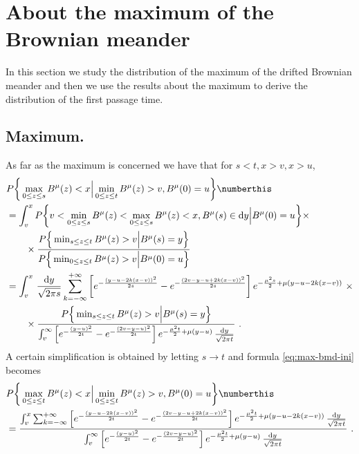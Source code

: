 %
\section{About the maximum of the Brownian meander}
%
%
%
In this section we study the distribution of the maximum of the drifted Brownian meander and then we use the results about the maximum to derive the distribution of the first passage time.
\subsection{Maximum.}
As far as the maximum is concerned we have that for $ s<t, x>v, x>u $, 
%
\begin{align*}
&
P\bigg\{ \max_{0 \leq z \leq s} B^\mu(z) <x \Big |  \min_{0 \leq z \leq t} B^\mu (z) > v, B^\mu(0) = u  \bigg\}
\numberthis 
\label{eq:max-bmd-ini}
\\
&=
\int_v^x 
P \bigg\{  v < \min_{0 \leq z \leq s} B^\mu(z) < \max_{0 \leq z \leq s} B^\mu(z) < x , 
	B^\mu(s) \in  \mathrm d y
	\Big | 
	B^\mu(0) = u
	 \bigg\} \times 
 	\\
 	& \qquad 
 	\times 
 	\frac{
 		P\Big\{   \min_{s \leq z \leq t} B^\mu(z)   > v  \Big | B^\mu ( s) = y \Big\}
 	}{
 		P\Big\{   \min_{0 \leq z \leq t} B^\mu(z)   > v  \Big | B^\mu ( 0) = u \Big\}
	}
	\\
	&=
	\int_v^x \, \frac{\mathrm d y}{\sqrt{2 \pi s}} \sum_{k = - \infty}^{+\infty}
	\left[ 
	e^{    -   \frac{(y - u - 2k(x-v))^2}{2s} } 
	- 
	e^{    -   \frac{(2v - y - u +2k(x-v))^2}{2s} }  
	\right ] 
	e^{ - \frac{\mu^2s}{2} + \mu ( y - u - 2k(x-v))} 
	\,\,\times 
	\\
	& \qquad \times 
	\frac{
		P\Big\{   \min_{s \leq z \leq t} B^\mu(z)   > v  \Big | B^\mu ( s) = y \Big\}
	}{
		\int_v^\infty 
		\left[ 
		e^{  - \frac{(y-u)^2}{2t}  } 
		- 
		e^{  - \frac{(2v - y-u)^2}{2t}  } 
		\right]
		e^{  - \frac{\mu^2 t}{2} + \mu ( y - u)   } \, \frac{ \mathrm d y}{\sqrt{2 \pi t} } 
	} \, \, .
\end{align*}
%
%
%
A certain simplification is obtained by letting $  s \to t $ and formula 
\eqref{eq:max-bmd-ini}  becomes
%
%
%
\begin{align*}
	&
	P\bigg\{ \max_{0 \leq z \leq t} B^\mu(z) <x \Big |  \min_{0 \leq z \leq t} B^\mu (z) > v, B^\mu(0) = u  \bigg\}
	\numberthis 
	\label{eq:max-bmd-t}
	\\
	&=
	\frac{
		\int_v^x \sum_{k = - \infty}^{+\infty}
		\left[ 
			e^{    -   \frac{(y - u - 2k(x-v))^2}{2t} } 
		- 
			e^{    -   \frac{(2v - y - u +2k(x-v))^2}{2t} }  %
		\right ] 
		e^{ - \frac{\mu^2t}{2} + \mu ( y - u - 2k(x-v))}
		\, \frac{ \mathrm d y}{\sqrt{2 \pi t} }
	}{
		\int_v^\infty 
		\left[ 
			e^{  - \frac{(y-u)^2}{2t}  }  
		- 
			e^{  - \frac{(2v - y-u)^2}{2t}  } 
		\right]
		e^{  - \frac{\mu^2 t}{2} + \mu ( y - u)   } \, \frac{ \mathrm d y}{\sqrt{2 \pi t} }
	} \, \, .
\end{align*}
